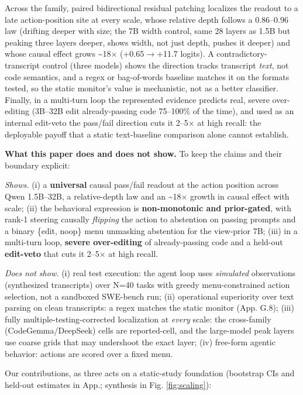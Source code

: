 \documentclass[
  11pt,
  a4paper]{article}
\begin{document}
Across the family, paired bidirectional residual patching localizes the
readout to a late action-position site at every scale, whose relative
depth follows a 0.86--0.96 law (drifting deeper with size; the 7B width
control, same 28 layers as 1.5B but peaking three layers deeper, shows
width, not just depth, pushes it deeper) and whose causal effect grows
\textasciitilde18\ensuremath{\times} (+0.65\ensuremath{\rightarrow}+11.7 logits). A contradictory-transcript
control (three models) shows the direction tracks transcript
\emph{text}, not code semantics, and a regex or bag-of-words baseline
matches it on the formats tested, so the static monitor's value is
mechanistic, not as a better classifier. Finally, in a multi-turn loop
the represented evidence predicts real, severe over-editing (3B--32B
edit already-passing code 75--100\% of the time), and used as an
internal edit-veto the pass/fail direction cuts it 2--5\ensuremath{\times} at high recall:
the deployable payoff that a static text-baseline comparison alone
cannot establish.

\textbf{What this paper does and does not show.} To keep the claims and
their boundary explicit:

\emph{Shows.} (i) a \textbf{universal} causal pass/fail readout at the
action position across Qwen 1.5B--32B, a relative-depth law and an
\textasciitilde18\ensuremath{\times} growth in causal effect with scale; (ii) the
behavioral expression is \textbf{non-monotonic and prior-gated}, with
rank-1 steering causally \emph{flipping} the action to abstention on
passing prompts and a binary \{edit, noop\} menu unmasking abstention
for the view-prior 7B; (iii) in a multi-turn loop, \textbf{severe
over-editing} of already-passing code and a held-out \textbf{edit-veto}
that cuts it 2--5\ensuremath{\times} at high recall.

\emph{Does not show.} (i) real test execution: the agent loop uses
\emph{simulated} observations (synthesized transcripts) over N=40 tasks
with greedy menu-constrained action selection, not a sandboxed SWE-bench
run; (ii) operational superiority over text parsing on clean
transcripts: a regex matches the static monitor (App. G.8); (iii) fully
multiple-testing-corrected localization at \emph{every} scale: the
cross-family (CodeGemma/DeepSeek) cells are reported-cell, and the
large-model peak layers use coarse grids that may undershoot the exact
layer; (iv) free-form agentic behavior: actions are scored over a fixed
menu.

Our contributions, as three acts on a static-study foundation (bootstrap
CIs and held-out estimates in App.; synthesis in Fig.
\ref{fig:scaling}):
\end{document}
